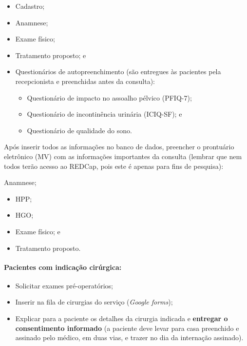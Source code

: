 \documentclass[
]{article}
\begin{document}
\begin{itemize}
\item
  Cadastro;
\item
  Anamnese;
\item
  Exame físico;
\item
  Tratamento proposto; e
\item
  Questionários de autopreenchimento (são entregues às pacientes pela
  recepcionista e preenchidas antes da consulta):

  \begin{itemize}
  \item
    Questionário de impacto no assoalho pélvico (PFIQ-7);
  \item
    Questionário de incontinência urinária (ICIQ-SF); e
  \item
    Questionário de qualidade do sono.
  \end{itemize}
\end{itemize}

Após inserir todos as informações no banco de dados, preencher o
prontuário eletrônico (MV) com as informações importantes da consulta
(lembrar que nem todos terão acesso ao REDCap, pois este é apenas para
fins de pesquisa):

Anamnese;

\begin{itemize}
\item
  HPP;
\item
  HGO;
\item
  Exame físico; e
\item
  Tratamento proposto.
\end{itemize}

\hypertarget{pacientes-com-indicauxe7uxe3o-ciruxfargica}{%
\paragraph{\texorpdfstring{\textbf{Pacientes com indicação
cirúrgica:}}{Pacientes com indicação cirúrgica:}}\label{pacientes-com-indicauxe7uxe3o-ciruxfargica}}

\begin{itemize}
\item
  Solicitar exames pré-operatórios;
\item
  Inserir na fila de cirurgias do serviço (\emph{Google forms});
\item
  Explicar para a paciente os detalhes da cirurgia indicada e
  \textbf{entregar o consentimento informado} (a paciente deve levar
  para casa preenchido e assinado pelo médico, em duas vias, e trazer no
  dia da internação assinado).
\end{itemize}
\end{document}

